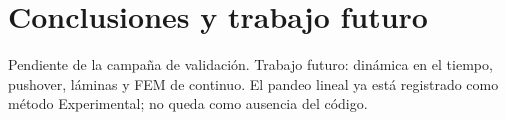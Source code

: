\chapter{Conclusiones y trabajo futuro}
Pendiente de la campaña de validación. Trabajo futuro: dinámica en el tiempo, pushover, láminas y FEM de continuo. El pandeo lineal ya está registrado como método Experimental; no queda como ausencia del código.
